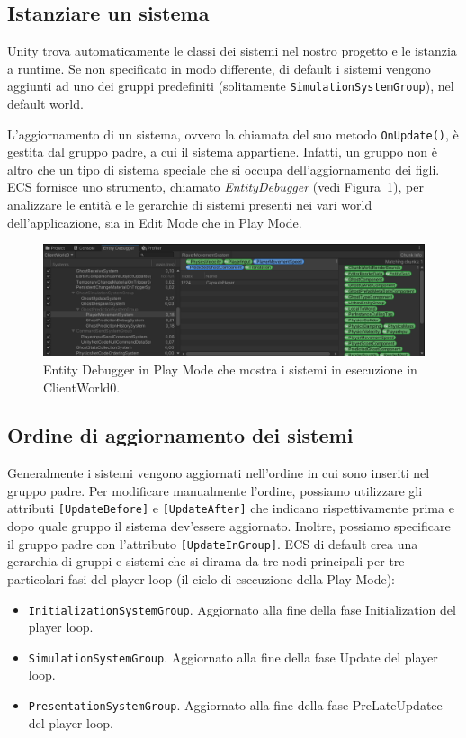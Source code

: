 \subsection{Istanziare un sistema}
Unity trova automaticamente le classi dei sistemi nel nostro progetto e le istanzia a runtime. Se non specificato in modo differente, di default i sistemi vengono aggiunti ad uno dei gruppi predefiniti (solitamente \verb|SimulationSystemGroup|), nel default world.

L'aggiornamento di un sistema, ovvero la chiamata del suo metodo \verb|OnUpdate()|, è gestita dal gruppo padre, a cui il sistema appartiene. Infatti, un gruppo non è altro che un tipo di sistema speciale che si occupa dell'aggiornamento dei figli.
ECS fornisce uno strumento, chiamato \emph{EntityDebugger} (vedi Figura~\ref{fig:entity-debugger}), per analizzare le entità e le gerarchie di sistemi presenti nei vari world dell'applicazione, sia in Edit Mode che in Play Mode.

\begin{figure}[!ht]
    \centering
    \includegraphics[width=0.95\columnwidth]{gfx/imgs/chapter2/EntityDebugger.png}
    \caption{Entity Debugger in Play Mode che mostra i sistemi in esecuzione in ClientWorld0.}
    \label{fig:entity-debugger}
\end{figure}

\subsection{Ordine di aggiornamento dei sistemi}
Generalmente i sistemi vengono aggiornati nell'ordine in cui sono inseriti nel gruppo padre. Per modificare manualmente l'ordine, possiamo utilizzare gli attributi \verb|[UpdateBefore]| e \verb|[UpdateAfter]| che indicano rispettivamente prima e dopo quale gruppo il sistema dev'essere aggiornato. Inoltre, possiamo specificare il gruppo padre con l'attributo \verb|[UpdateInGroup]|.
ECS di default crea una gerarchia di gruppi e sistemi che si dirama da tre nodi principali per tre particolari fasi del player loop (il ciclo di esecuzione della Play Mode):
\begin{itemize}
    \item \verb|InitializationSystemGroup|. Aggiornato alla fine della fase Initialization del player loop.
    \item \verb|SimulationSystemGroup|. Aggiornato alla fine della fase Update del player loop.
    \item \verb|PresentationSystemGroup|. Aggiornato alla fine della fase PreLateUpdatee del player loop.
\end{itemize}

